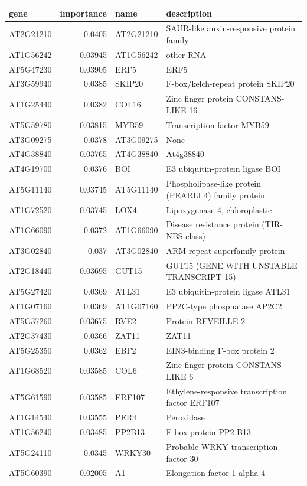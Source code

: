 \documentclass[11pt]{article}
\begin{document}
\begin{center}
\begin{tabular}{lrll}
gene & importance & name & description\\
\hline
AT2G21210 & 0.0405 & AT2G21210 & SAUR-like auxin-responsive protein family\\
AT1G56242 & 0.03945 & AT1G56242 & other RNA\\
AT5G47230 & 0.03905 & ERF5 & ERF5\\
AT3G59940 & 0.0385 & SKIP20 & F-box/kelch-repeat protein SKIP20\\
AT1G25440 & 0.0382 & COL16 & Zinc finger protein CONSTANS-LIKE 16\\
AT5G59780 & 0.03815 & MYB59 & Transcription factor MYB59\\
AT3G09275 & 0.0378 & AT3G09275 & None\\
AT4G38840 & 0.03765 & AT4G38840 & At4g38840\\
AT4G19700 & 0.0376 & BOI & E3 ubiquitin-protein ligase BOI\\
AT5G11140 & 0.03745 & AT5G11140 & Phospholipase-like protein (PEARLI 4) family protein\\
AT1G72520 & 0.03745 & LOX4 & Lipoxygenase 4, chloroplastic\\
AT1G66090 & 0.0372 & AT1G66090 & Disease resistance protein (TIR-NBS class)\\
AT3G02840 & 0.037 & AT3G02840 & ARM repeat superfamily protein\\
AT2G18440 & 0.03695 & GUT15 & GUT15 (GENE WITH UNSTABLE TRANSCRIPT 15)\\
AT5G27420 & 0.0369 & ATL31 & E3 ubiquitin-protein ligase ATL31\\
AT1G07160 & 0.0369 & AT1G07160 & PP2C-type phosphatase AP2C2\\
AT5G37260 & 0.03675 & RVE2 & Protein REVEILLE 2\\
AT2G37430 & 0.0366 & ZAT11 & ZAT11\\
AT5G25350 & 0.0362 & EBF2 & EIN3-binding F-box protein 2\\
AT1G68520 & 0.03585 & COL6 & Zinc finger protein CONSTANS-LIKE 6\\
AT5G61590 & 0.03585 & ERF107 & Ethylene-responsive transcription factor ERF107\\
AT1G14540 & 0.03555 & PER4 & Peroxidase\\
AT1G56240 & 0.03485 & PP2B13 & F-box protein PP2-B13\\
AT5G24110 & 0.0345 & WRKY30 & Probable WRKY transcription factor 30\\
AT5G60390 & 0.02005 & A1 & Elongation factor 1-alpha 4\\
\end{tabular}
\end{center}
\end{document}

